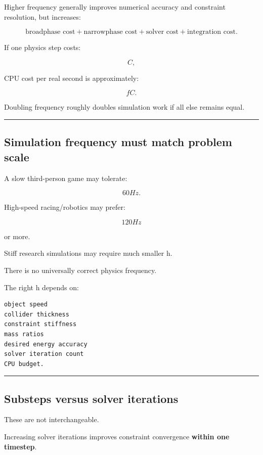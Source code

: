 Higher frequency generally improves numerical accuracy and constraint resolution, but increases:

\[
\text{broadphase cost}
+
\text{narrowphase cost}
+
\text{solver cost}
+
\text{integration cost}.
\]

If one physics step costs:

\[
C,
\]

CPU cost per real second is approximately:

\[
fC.
\]

Doubling frequency roughly doubles simulation work if all else remains equal.

\begin{center}\rule{0.5\linewidth}{0.5pt}\end{center}

\subsection{Simulation frequency must match problem scale}\label{06-engine-ii-ch038-simulation-frequency-must-match-problem-scale}

A slow third-person game may tolerate:

\[
60Hz.
\]

High-speed racing/robotics may prefer:

\[
120Hz
\]

or more.

Stiff research simulations may require much smaller h.

There is no universally correct physics frequency.

The right h depends on:

\begin{verbatim}
object speed
collider thickness
constraint stiffness
mass ratios
desired energy accuracy
solver iteration count
CPU budget.
\end{verbatim}

\begin{center}\rule{0.5\linewidth}{0.5pt}\end{center}

\subsection{Substeps versus solver iterations}\label{06-engine-ii-ch038-substeps-versus-solver-iterations}

These are not interchangeable.

Increasing solver iterations improves constraint convergence \textbf{within one timestep}.

